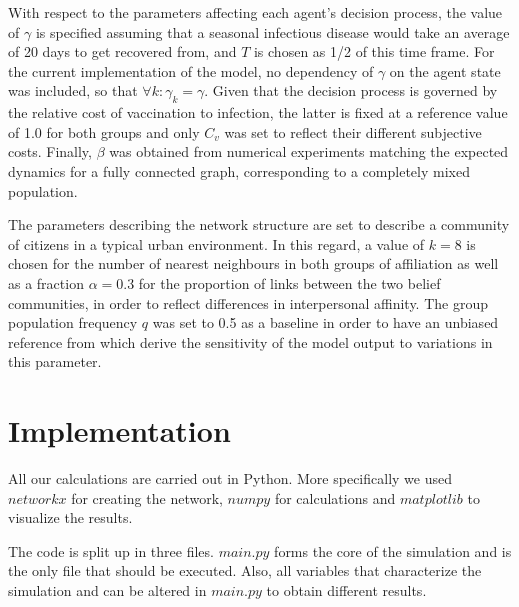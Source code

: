 \documentclass[11pt]{article}
\begin{document}
With respect to the parameters affecting each agent's decision process, the value of \(\gamma\) is specified assuming that a seasonal infectious disease would take an average of 20 days to get recovered from, and \(T\) is chosen as 1/2 of this time frame. For the current implementation of the model, no dependency of \(\gamma\) on the agent state was included, so that \(\forall k : \gamma_{k} = \gamma\). Given that the decision process is governed by the relative cost of vaccination to infection, the latter is fixed at a reference value of 1.0 for both groups and only \(C_v\) was set to reflect their different subjective costs. Finally, \(\beta\) was obtained from numerical experiments matching the expected dynamics for a fully connected graph, corresponding to a completely mixed population.

The parameters describing the network structure are set to describe a community of citizens in a typical urban environment. In this regard, a value of \(k = 8\) is chosen for the number of nearest neighbours in both groups of affiliation as well as a fraction \(\alpha = 0.3\) for the proportion of links between the two belief communities, in order to reflect differences in interpersonal affinity. The group population frequency \(q\) was set to 0.5 as a baseline in order to have an unbiased reference from which derive the sensitivity of the model output to variations in this parameter.



\section{Implementation}
\label{sec:Im}

All our calculations are carried out in Python. More specifically we used $networkx$ for creating the network, $numpy$ for calculations and $matplotlib$ to visualize the results.

The code is split up in three files. $main.py$ forms the core of the simulation and is the only file that should be executed. Also, all variables that characterize the simulation and can be altered in $main.py$ to obtain different results.
\end{document}
